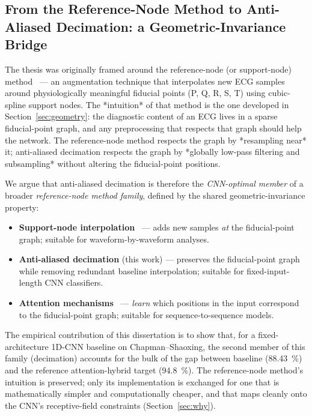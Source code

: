 \documentclass[conference]{IEEEtran}
\begin{document}
\subsection{From the Reference-Node Method to Anti-Aliased Decimation:
            a Geometric-Invariance Bridge}
\label{sec:bridge}
The thesis was originally framed around the reference-node (or
support-node) method~\cite{chen2021,xu2022} — an augmentation technique
that interpolates new ECG samples around physiologically meaningful
fiducial points (P, Q, R, S, T) using cubic-spline support nodes. The
*intuition* of that method is the one developed in
Section~\ref{sec:geometry}: the diagnostic content of an ECG lives in a
sparse fiducial-point graph, and any preprocessing that respects that
graph should help the network. The reference-node method respects the
graph by *resampling near* it; anti-aliased decimation respects the
graph by *globally low-pass filtering and subsampling* without altering
the fiducial-point positions.

We argue that anti-aliased decimation is therefore the
\emph{CNN-optimal member} of a broader \emph{reference-node method
family}, defined by the shared geometric-invariance property:
\begin{itemize}
  \item \textbf{Support-node interpolation}~\cite{chen2021,xu2022} —
        adds new samples \emph{at} the fiducial-point graph; suitable
        for waveform-by-waveform analyses.
  \item \textbf{Anti-aliased decimation} (this work) — preserves the
        fiducial-point graph while removing redundant baseline
        interpolation; suitable for fixed-input-length CNN
        classifiers.
  \item \textbf{Attention mechanisms}~\cite{oh2018,strodthoff2020} —
        \emph{learn} which positions in the input correspond to the
        fiducial-point graph; suitable for sequence-to-sequence
        models.
\end{itemize}
The empirical contribution of this dissertation is to show that, for
a fixed-architecture 1D-CNN baseline on Chapman--Shaoxing, the second
member of this family (decimation) accounts for the bulk of the gap
between baseline (\SI{88.43}{\percent}) and the reference attention-hybrid
target (\SI{94.8}{\percent}). The reference-node method's intuition is
preserved; only its implementation is exchanged for one that is
mathematically simpler and computationally cheaper, and that maps
cleanly onto the CNN's receptive-field constraints (Section~\ref{sec:why}).
\end{document}
